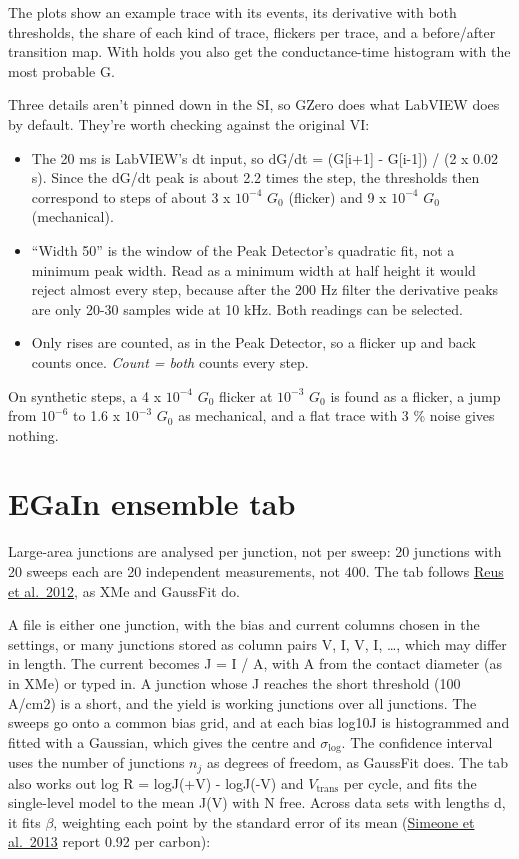 \documentclass[
  11pt,
  a4paper,
]{article}
\providecommand{\tightlist}{%
  \setlength{\itemsep}{0pt}\setlength{\parskip}{0pt}}
\begin{document}
The plots show an example trace with its events, its derivative with
both thresholds, the share of each kind of trace, flickers per trace,
and a before/after transition map. With holds you also get the
conductance-time histogram with the most probable G.

Three details aren't pinned down in the SI, so GZero does what LabVIEW
does by default. They're worth checking against the original VI:

\begin{itemize}
\tightlist
\item
  The 20 ms is LabVIEW's dt input, so dG/dt = (G{[}i+1{]} - G{[}i-1{]})
  / (2 x 0.02 s). Since the dG/dt peak is about 2.2 times the step, the
  thresholds then correspond to steps of about 3 x $10^{-4}$ $G_0$
  (flicker) and 9 x $10^{-4}$ $G_0$ (mechanical).
\item
  ``Width 50'' is the window of the Peak Detector's quadratic fit, not a
  minimum peak width. Read as a minimum width at half height it would
  reject almost every step, because after the 200 Hz filter the
  derivative peaks are only 20-30 samples wide at 10 kHz. Both readings
  can be selected.
\item
  Only rises are counted, as in the Peak Detector, so a flicker up and
  back counts once. \emph{Count = both} counts every step.
\end{itemize}

On synthetic steps, a 4 x $10^{-4}$ $G_0$ flicker at $10^{-3}$ $G_0$ is
found as a flicker, a jump from $10^{-6}$ to 1.6 x $10^{-3}$ $G_0$ as
mechanical, and a flat trace with 3 \% noise gives nothing.

\hypertarget{egain-ensemble-tab}{%
\section{EGaIn ensemble tab}\label{egain-ensemble-tab}}

Large-area junctions are analysed per junction, not per sweep: 20
junctions with 20 sweeps each are 20 independent measurements, not 400.
The tab follows \href{https://doi.org/10.1021/jp210445y}{Reus et
al.~2012}, as XMe and GaussFit do.

A file is either one junction, with the bias and current columns chosen
in the settings, or many junctions stored as column pairs V, I, V, I,
\ldots, which may differ in length. The current becomes J = I / A, with
A from the contact diameter (as in XMe) or typed in. A junction whose
\textbar J\textbar{} reaches the short threshold (100 A/cm2) is a short,
and the yield is working junctions over all junctions. The sweeps go
onto a common bias grid, and at each bias log10\textbar J\textbar{} is
histogrammed and fitted with a Gaussian, which gives the centre and
$\sigma_\mathrm{log}$. The confidence interval uses the number of
junctions $n_j$ as degrees of freedom, as GaussFit does. The tab also
works out log R = log\textbar J(+V)\textbar{} -
log\textbar J(-V)\textbar{} and $V_\mathrm{trans}$ per cycle, and fits
the single-level model to the mean J(V) with N free. Across data sets
with lengths d, it fits $\beta$, weighting each point by the standard
error of its mean (\href{https://doi.org/10.1021/ja408652h}{Simeone et
al.~2013} report 0.92 per carbon):
\end{document}
